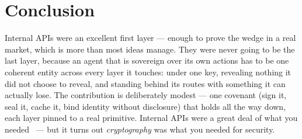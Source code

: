 \documentclass[11pt]{article}
\begin{document}
\section{Conclusion}

Internal APIs were an excellent first layer --- enough to prove the wedge in a real
market, which is more than most ideas manage. They were never going to be the last
layer, because an agent that is sovereign over its own actions has to be one
coherent entity across every layer it touches: under one key, revealing nothing it
did not choose to reveal, and standing behind its routes with something it can
actually lose. The contribution is deliberately modest --- one covenant (sign it,
seal it, cache it, bind identity without disclosure) that holds all the way down,
each layer pinned to a real primitive. Internal APIs were a great deal of what you
needed~\cite{wedge} --- but it turns out \emph{cryptography} was what you needed for
security.
\end{document}
